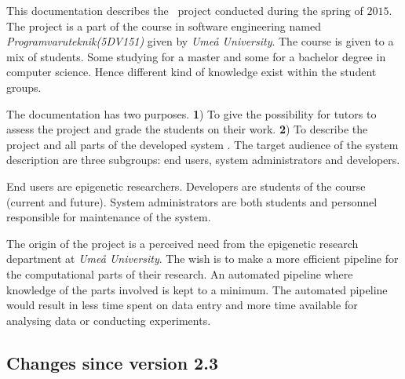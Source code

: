\thispagestyle{preface}

%
%

This documentation describes the \appName\ project conducted during the spring of $2015$. The project is a part of the course in software engineering named \textit{Programvaruteknik(5DV151)} given by \textit{Umeå University}. The course is given to a mix of students. Some studying for a master and some for a bachelor degree in computer science. Hence different kind of knowledge exist within the student groups.

The documentation has two purposes. \textbf{1}) To give the possibility for tutors to assess the project and grade the students on their work. \textbf{2}) To describe the project and all parts of the developed system . 
The target audience of the system description are three subgroups: end users, system administrators and developers.

End users are epigenetic researchers. Developers are students of the course (current and future). System administrators are both students and personnel responsible for maintenance of the system.

The origin of the project is a perceived need from the epigenetic research department at \textit{Umeå University}. The wish is to make a more efficient pipeline for the computational parts of their research. An automated pipeline where knowledge of the parts involved is kept to a minimum. The automated pipeline would result in less time spent on  data entry and more time available for analysing data or conducting experiments.

\subsection*{Changes since version 2.3}\vspace*{-10pt}

